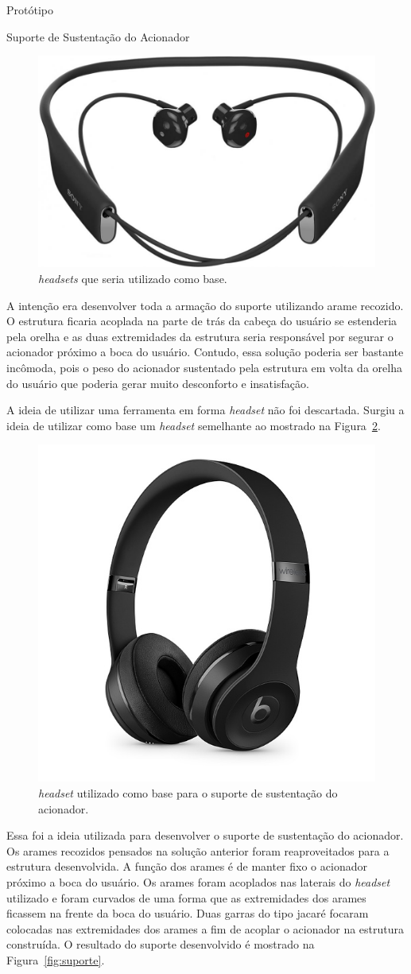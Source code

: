 \begin{chapter}{Protótipo}
\begin{section}{Suporte de Sustentação do Acionador}
\begin{figure}[!h]
	\centering
	\begin{minipage}[c]{\textwidth}
	\centering
	\includegraphics[width=0.4\linewidth]{fig/heaset}
	\caption{\textit{headsets} que seria utilizado como base.}
	\label{fig:headset}
	\end{minipage}
\end{figure} 

A intenção era desenvolver toda a armação do suporte utilizando arame recozido.
O estrutura ficaria acoplada na parte de trás da cabeça do usuário se estenderia
pela orelha e as duas extremidades da estrutura seria responsável por segurar o
acionador próximo a boca do usuário. Contudo, essa solução poderia ser
bastante incômoda, pois o peso do acionador sustentado pela estrutura em volta
da orelha do usuário que poderia gerar muito desconforto e insatisfação.

A ideia de utilizar uma ferramenta em forma \textit{headset} não foi descartada.
Surgiu a ideia de utilizar como base um \textit{headset} semelhante ao mostrado 
na Figura~\ref{fig:fone}. 
 
\begin{figure}[!h]
	\centering
	\begin{minipage}[c]{\textwidth}
	\centering
	\includegraphics[width=0.4\linewidth]{fig/fone}
	\caption{\textit{headset} utilizado como base para o suporte de sustentação
do acionador.}
	\label{fig:fone}
	\end{minipage}
\end{figure}

Essa foi a ideia utilizada para desenvolver o suporte de sustentação do
acionador. Os arames recozidos pensados na solução anterior foram reaproveitados
para a estrutura desenvolvida. A função dos arames é de manter fixo o acionador
próximo a boca do usuário. Os arames foram acoplados nas laterais do
\textit{headset} utilizado e foram curvados de uma forma que as extremidades
dos arames ficassem na frente da boca do usuário. Duas garras do tipo jacaré
focaram colocadas nas extremidades  dos arames a fim de acoplar o acionador na
estrutura construída. O resultado do suporte desenvolvido é mostrado na
Figura~\ref{fig:suporte}. 


\end{section}
\end{chapter}
